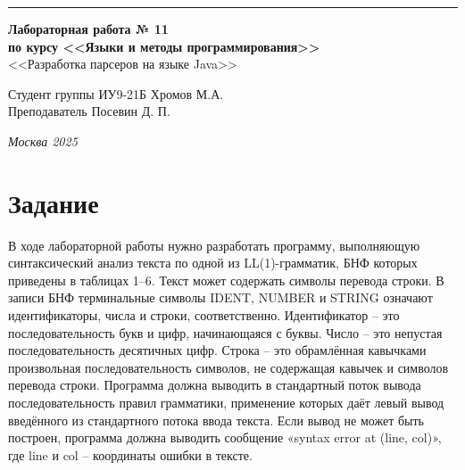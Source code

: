 \documentclass[a4paper, 14pt]{extarticle}
\begin{document}
\begin{titlepage}
\vspace*{-16pt}
\hspace{30pt}\rule{0.866\textwidth}{0.4pt}
  
\vspace{11em}

\begin{center}
\Large {\bf Лабораторная работа № 11} \\ 
\large {\bf по курсу <<Языки и методы программирования>>} \\ 
\large <<Разработка парсеров на языке Java>>
\end{center}\normalsize

\vspace{8em}


\begin{flushright}
  {Студент группы ИУ9-21Б Хромов М.А.\hspace*{15pt} \\
  \vspace{2ex}
  Преподаватель Посевин Д. П.\hspace*{15pt}}
\end{flushright}

\bigskip

\vfill
 

\begin{center}
\textsl{Москва 2025}
\end{center}
\end{titlepage}

\renewcommand{\ttdefault}{pcr}

\setlength{\tabcolsep}{3pt}
\newpage


 

\section{Задание}\label{Sect::task}
\par
В ходе лабораторной работы нужно разработать программу, выполняющую
синтаксический анализ текста по одной из LL(1)-грамматик, БНФ которых приведены в
таблицах 1–6. Текст может содержать символы перевода строки.
В записи БНФ терминальные символы IDENT, NUMBER и STRING означают
идентификаторы, числа и строки, соответственно. Идентификатор – это последовательность
букв и цифр, начинающаяся с буквы. Число – это непустая последовательность десятичных
цифр. Строка – это обрамлённая кавычками произвольная последовательность символов, не
содержащая кавычек и символов перевода строки.
Программа должна выводить в стандартный поток вывода последовательность правил
грамматики, применение которых даёт левый вывод введённого из стандартного потока
ввода текста. Если вывод не может быть построен, программа должна выводить сообщение
«syntax error at (line, col)», где line и col – координаты ошибки в тексте.
\end{document}
